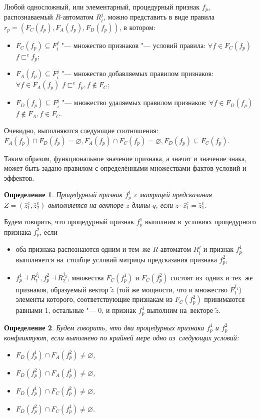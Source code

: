 \documentclass[a4paper, 12pt]{article}
\theoremstyle{plain}
\newtheorem{Def}{Определение}
\begin{document}
	Любой односложный, или элементарный, процедурный признак $f_p$, распознаваемый $R$-автоматом $R_i^j$, можно представить в виде правила $r_p=(F_C(f_p),F_A(f_p),F_D(f_p))$, в котором:
	\begin{itemize}
		\item $F_C (f_p )\subseteq F_i^j$ "--- множество признаков "--- условий правила: $\forall f\in F_C(f_p)$ $f\sqsubset^c f_p$;
		\item $F_A(f_p)\subseteq F_i^j$ "--- множество добавляемых правилом признаков: $\forall f\in F_A(f_p)$ $f\sqsubset^e f_p,f\notin F_C$;
		\item $F_D(f_p)\subseteq F_i^j$ "--- множество удаляемых правилом признаков: $\forall f\in F_D(f_p)$ $f\notin F_A,f\in F_C$.
	\end{itemize}
	Очевидно, выполняются следующие соотношения: $F_A(f_p)\cap F_D(f_p)=\varnothing, F_A(f_p)\cap F_C(f_p)=\varnothing, F_D(f_p)\subseteq F_C(f_p)$.
	
	Таким образом, функциональное значение признака, а значит и значение знака, может быть задано правилом с определёнными множествами фактов условий и эффектов.
	\begin{Def}
		Процедурный признак $f_p^1$ c матрицей предсказания $Z=(\bar z_1^c,\bar z_2^e)$ выполняется на векторе $z$ длины $q$, если $z\cdot \bar z_1^c=\bar z_1^c$.
	\end{Def}
	Будем говорить, что процедурный признак $f_p^1$ выполним в~условиях процедурного признака $f_p^2$, если 
	\begin{itemize}
		\item оба признака распознаются одним и тем~же $R$-автоматом $R_i^j$ и признак  $f_p^1$ выполняется на~столбце условий матрицы предсказания признака $f_p^2$,
		\item $f_p^1\dashv R_1^{j_1}, f_p^2\dashv R_2^{j_2}$, множества $F_C(f_p^1 )$ и $F_C(f_p^2)$ состоят из~одних и тех~же признаков, образуемый вектор $\tilde z$ (той же мощности, что и множество $F_1^{j_1}$) элементы которого, соответствующие признакам из $F_C(f_p^2)$ принимаются равными $1$,  остальные "--- $0$, и признак $f_p^1$ выполним на~векторе $\tilde z$. 
	\end{itemize}
	
	\begin{Def}
		Будем говорить, что два процедурных признака $f_p^1$ и $f_p^2$ конфликтуют, если выполнено по крайней мере одно из~следующих условий:
		\begin{itemize}
			\item $F_D(f_p^1)\cap F_A(f_p^2)\not=\varnothing$,
			\item $F_D(f_p^2)\cap F_A(f_p^1)\not=\varnothing$,
			\item $F_D(f_p^1)\cap F_C(f_p^2)\not=\varnothing$,
			\item $F_D(f_p^2)\cap F_C(f_p^1)\not=\varnothing$.
		\end{itemize}
	\end{Def}
	
\end{document}
